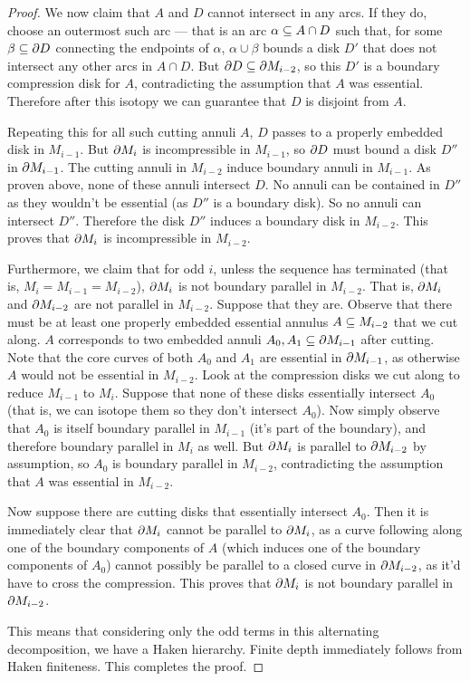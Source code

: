 \begin{proof}
We now claim that $A$ and $D$ cannot intersect in any arcs. If they do, choose
an outermost such arc --- that is an arc $\alpha \subseteq A \cap D$ such that, for
some $\beta \subseteq \partial D$ connecting the endpoints of $\alpha$, $\alpha \cup
\beta$ bounds a disk $D'$ that does not intersect any other arcs in $A \cap D$.
But $\partial D \subseteq \partial M_{i-2}$, so this $D'$ is a boundary compression disk for
$A$, contradicting the assumption that $A$ was essential. Therefore after this
isotopy we can guarantee that $D$ is disjoint from $A$.

Repeating this for all such cutting annuli $A$, $D$ passes to a properly
embedded disk in $M_{i-1}$. But $\partial M_i$ is incompressible in $M_{i-1}$, so
$\partial D$ must bound a disk $D''$ in $\partial M_{i-1}$. The cutting annuli in
$M_{i-2}$ induce boundary annuli in $M_{i-1}$. As proven above, none of these
annuli intersect $D$.  No annuli can be contained in $D''$ as they wouldn't be
essential (as $D''$ is a boundary disk). So no annuli can intersect $D''$.
Therefore the disk $D''$ induces a boundary disk in $M_{i-2}$. This proves that
$\partial M_i$ is incompressible in $M_{i-2}$.

Furthermore, we claim that for odd $i$, unless the sequence has terminated
(that is, $M_i=M_{i-1}=M_{i-2}$), $\partial M_i$ is not boundary parallel in
$M_{i-2}$.  That is, $\partial M_i$ and $\partial M_{i-2}$ are not parallel in $M_{i-2}$.
Suppose that they are.  Observe that there must be at least one properly
embedded essential annulus $A \subseteq M_{i-2}$ that we cut along. $A$ corresponds
to two embedded annuli $A_0, A_1 \subseteq \partial M_{i-1}$ after cutting.  Note that
the core curves of both $A_0$ and $A_1$ are essential in $\partial M_{i-1}$, as
otherwise $A$ would not be essential in $M_{i-2}$.  Look at the compression
disks we cut along to reduce $M_{i-1}$ to $M_i$.  Suppose that none of these
disks essentially intersect $A_0$ (that is, we can isotope them so they don't
intersect $A_0$). Now simply observe that $A_0$ is itself boundary parallel in
$M_{i-1}$ (it's part of the boundary), and therefore boundary parallel in $M_i$
as well. But $\partial M_i$ is parallel to $\partial M_{i-2}$ by assumption, so $A_0$ is
boundary parallel in $M_{i-2}$, contradicting the assumption that $A$ was
essential in $M_{i-2}$.

Now suppose there are cutting disks that essentially intersect $A_0$. Then it
is immediately clear that $\partial M_i$ cannot be parallel to $\partial M_i$, as a curve
following along one of the boundary components of $A$ (which induces one of the
boundary components of $A_0$) cannot possibly be parallel to a closed curve in
$\partial M_{i-2}$, as it'd have to cross the compression. This proves that $\partial
M_i$ is not boundary parallel in $\partial M_{i-2}$.

This means that considering only the odd terms in this alternating
decomposition, we have a Haken hierarchy. Finite depth immediately follows from
Haken finiteness. This completes the proof.

\end{proof}

